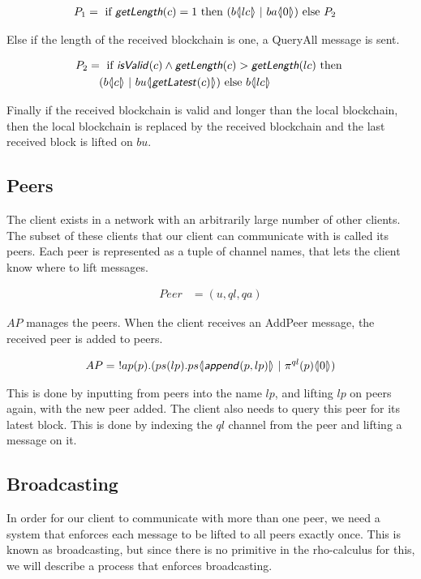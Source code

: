 \begin{align*}
	P_1 &=\text{ if }\text{\sffamily \textit{getLength}\normalfont}(c)=1\text{ then }(b \langle \! | lc | \! \rangle\ |\ ba  \langle \! | 0 | \! \rangle)\text{ else }P_2
\end{align*}

Else if the length of the received blockchain is one, a QueryAll message is sent.

\begin{align*}
	P_2 &=\text{ if }\text{\sffamily \textit{isValid}\normalfont}(c) \land \text{\sffamily \textit{getLength}\normalfont}(c) > \text{\sffamily \textit{getLength}\normalfont}(lc)\text{ then }\\
	&\quad(b \langle \! | c | \! \rangle\ |\ bu  \langle \! | \text{\sffamily \textit{getLatest}\normalfont}(c) | \! \rangle)\text{ else }b \langle \! | lc | \! \rangle
\end{align*}

Finally if the received blockchain is valid and longer than the local blockchain, then the local blockchain is replaced by the received blockchain and the last received block is lifted on $bu$.

\subsection{Peers}
The client exists in a network with an arbitrarily large number of other clients.
The subset of these clients that our client can communicate with is called its peers.
Each peer is represented as a tuple of channel names, that lets the client know where to lift messages.

\begin{align*}
    Peer &= (u, ql, qa)
\end{align*}

$AP$ manages the peers.
When the client receives an AddPeer message, the received peer is added to peers.

\begin{align*}
    AP &=\ !ap(p).(ps(lp).ps\lift{}{\mop{append}(p,lp)}\ |\ \pi^{ql}(p)\lift{}{0})\\
\end{align*}

This is done by inputting from peers into the name $lp$, and lifting $lp$ on peers again, with the new peer added.
The client also needs to query this peer for its latest block.
This is done by indexing the $ql$ channel from the peer and lifting a message on it.

\subsection{Broadcasting} \label{broadcast}
In order for our client to communicate with more than one peer, we need a system that enforces each message to be lifted to all peers exactly once.
This is known as broadcasting, but since there is no primitive in the rho-calculus for this, we will describe a process that enforces broadcasting.

